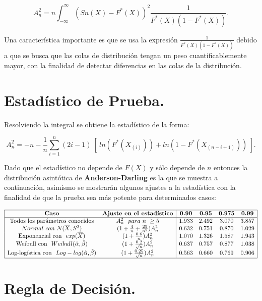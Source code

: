 \documentclass[
  a4paper,
  oneside,
  openany]{book}
\begin{document}
\[A_n^2=n \int_{-\infty}^{\infty} (Sn(X)-F^*(X))^2 \frac{1}{F^*(X)(1-F^*(X))}.\]

Una característica importante es que se usa la expresión \(\frac{1}{F^*(X)(1-F^*(X))}\) debido a que se busca que las colas de distribución tengan un peso cuantificablemente mayor, con la finalidad de detectar diferencias en las colas de la distribución.

\hypertarget{estaduxedstico-de-prueba.-1}{%
\section{Estadístico de Prueba.}\label{estaduxedstico-de-prueba.-1}}

Resolviendo la integral se obtiene la estadístico de la forma:

\[A_n^2=-n-\frac{1}{n}\sum_{i=1}^{n}\left(2i-1\right) \ [ \ ln(F^*(X_{(i)})) +ln(1-F^*(X_{(n-i+1)})) \ ].\]

Dado que el estadístico no depende de \(F(X)\) y sólo depende de \(n\) entonces la distribución asintótica de \textbf{Anderson-Darling} es la que se muestra a continuación, asimismo se mostrarán algunos ajustes a la estadística con la finalidad de que la prueba sea más potente para determinados
casos:

\[
\begin{array}{|c c| c c c c|}
\hline
\textbf{Caso} & \textbf{Ajuste en el estadístico} &\textbf{0.90} &\textbf{0.95} & \textbf{0.975} & \textbf{0.99} \\
\hline
\mbox{Todos los parámetros conocidos} & A_{n}^{2} \ \ para\ n\ \geq 5 & 1.933 & 2.492 & 3.070 & 3.857 \\
Normal\ con\ N(\overline{X},S^2) & (1+\frac{4}{n}+\frac{25}{n^2})A_{n}^{2} & 0.632 & 0.751 & 0.870 & 1.029 \\
\mbox{Exponencial con} \ \ exp(\overline{X}) & (1+\frac{0.6}{n})A_{n}^{2} & 1.070 & 1.326 & 1.587 & 1.943 \\
\mbox{Weibull con} \ \ Weibull(\hat{\alpha},\hat{\beta}) & (1+\frac{0.2}{\sqrt{n}})A_{n}^{2} & 0.637 & 0.757 & 0.877 & 1.038 \\
\mbox{Log-logística con} \ \ Log-log(\hat{\alpha},\hat{\beta}) & (1+\frac{0.25}{\sqrt{n}})A_{n}^{2} & 0.563 & 0.660 & 0.769 & 0.906 \\
\hline
\end{array}
\]

\hypertarget{regla-de-decisiuxf3n.-2}{%
\section{Regla de Decisión.}\label{regla-de-decisiuxf3n.-2}}
\end{document}
